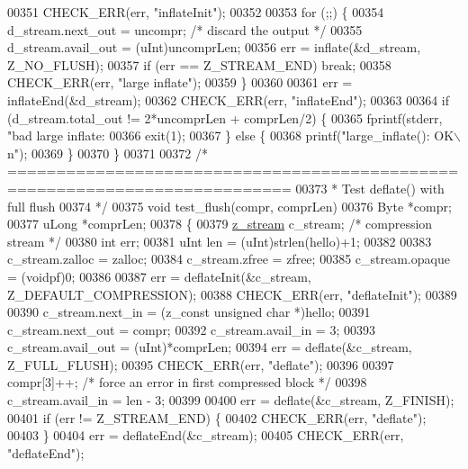 \begin{DoxyCode}
{{{{{{{{{{{{00351     CHECK\_ERR(err, \textcolor{stringliteral}{"inflateInit"});
00352 
00353     \textcolor{keywordflow}{for} (;;) \{
00354         d\_stream.next\_out = uncompr;            \textcolor{comment}{/* discard the output */}
00355         d\_stream.avail\_out = (uInt)uncomprLen;
00356         err = inflate(&d\_stream, Z\_NO\_FLUSH);
00357         \textcolor{keywordflow}{if} (err == Z\_STREAM\_END) \textcolor{keywordflow}{break};
00358         CHECK\_ERR(err, \textcolor{stringliteral}{"large inflate"});
00359     \}
00360 
00361     err = inflateEnd(&d\_stream);
00362     CHECK\_ERR(err, \textcolor{stringliteral}{"inflateEnd"});
00363 
00364     \textcolor{keywordflow}{if} (d\_stream.total\_out != 2*uncomprLen + comprLen/2) \{
00365         fprintf(stderr, \textcolor{stringliteral}{"bad large inflate: %
00366         exit(1);
00367     \} \textcolor{keywordflow}{else} \{
00368         printf(\textcolor{stringliteral}{"large\_inflate(): OK\(\backslash\)n"});
00369     \}
00370 \}
00371 
00372 \textcolor{comment}{/* ===========================================================================}
00373 \textcolor{comment}{ * Test deflate() with full flush}
00374 \textcolor{comment}{ */}
00375 \textcolor{keywordtype}{void} test\_flush(compr, comprLen)
00376     Byte *compr;
00377     uLong *comprLen;
00378 \{
00379     \hyperlink{structz__stream__s}{z\_stream} c\_stream; \textcolor{comment}{/* compression stream */}
00380     \textcolor{keywordtype}{int} err;
00381     uInt len = (uInt)strlen(hello)+1;
00382 
00383     c\_stream.zalloc = zalloc;
00384     c\_stream.zfree = zfree;
00385     c\_stream.opaque = (voidpf)0;
00386 
00387     err = deflateInit(&c\_stream, Z\_DEFAULT\_COMPRESSION);
00388     CHECK\_ERR(err, \textcolor{stringliteral}{"deflateInit"});
00389 
00390     c\_stream.next\_in  = (z\_const \textcolor{keywordtype}{unsigned} \textcolor{keywordtype}{char} *)hello;
00391     c\_stream.next\_out = compr;
00392     c\_stream.avail\_in = 3;
00393     c\_stream.avail\_out = (uInt)*comprLen;
00394     err = deflate(&c\_stream, Z\_FULL\_FLUSH);
00395     CHECK\_ERR(err, \textcolor{stringliteral}{"deflate"});
00396 
00397     compr[3]++; \textcolor{comment}{/* force an error in first compressed block */}
00398     c\_stream.avail\_in = len - 3;
00399 
00400     err = deflate(&c\_stream, Z\_FINISH);
00401     \textcolor{keywordflow}{if} (err != Z\_STREAM\_END) \{
00402         CHECK\_ERR(err, \textcolor{stringliteral}{"deflate"});
00403     \}
00404     err = deflateEnd(&c\_stream);
00405     CHECK\_ERR(err, \textcolor{stringliteral}{"deflateEnd"});
}}}}}}}}}}}}}
\end{DoxyCode}
